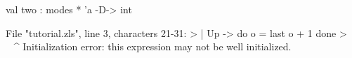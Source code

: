 \chklistingfalse
{}
\begin{ChkListingMsg}
val two : modes * 'a -D-> int 
\end{ChkListingMsg}
\begin{ChkListingErr}
File "tutorial.zls", line 3, characters 21-31:
>      | Up -> do o = last o + 1 done
>                     ^^^^^^^^^^
Initialization error: this expression may not be well initialized.
\end{ChkListingErr}
